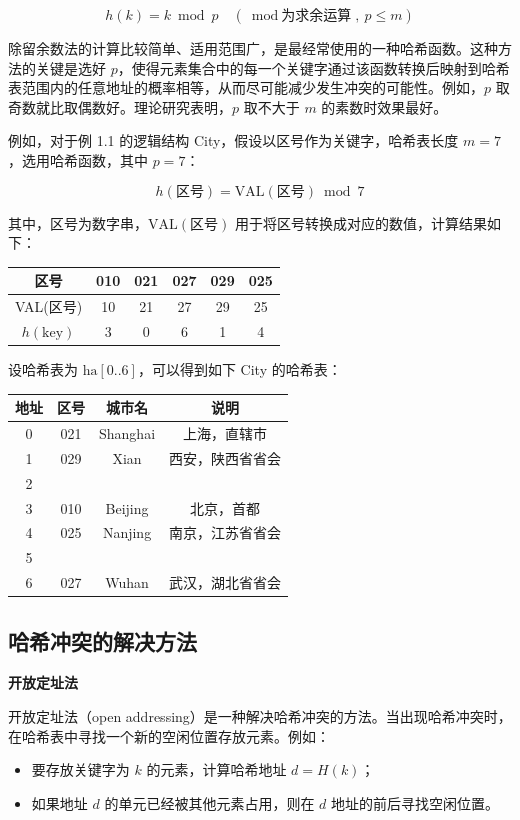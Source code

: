 \documentclass[lang=cn,newtx,10pt,scheme=chinese]{../elegantbook}
\begin{document}
\[
h(k) = k \bmod p \quad (\bmod \text{为求余运算},\ p \leq m)
\]

除留余数法的计算比较简单、适用范围广，是最经常使用的一种哈希函数。这种方法的关键是选好 $p$，使得元素集合中的每一个关键字通过该函数转换后映射到哈希表范围内的任意地址的概率相等，从而尽可能减少发生冲突的可能性。例如，$p$ 取奇数就比取偶数好。理论研究表明，$p$ 取不大于 $m$ 的素数时效果最好。

例如，对于例 1.1 的逻辑结构 City，假设以区号作为关键字，哈希表长度 $m=7$，选用哈希函数，其中 $p=7$：

\[
h(\text{区号}) = \text{VAL}(\text{区号}) \bmod 7
\]

其中，区号为数字串，$\text{VAL}(\text{区号})$ 用于将区号转换成对应的数值，计算结果如下：

\begin{center}
\begin{tabular}{|c|c|c|c|c|c|}
\hline
区号 & 010 & 021 & 027 & 029 & 025 \\
\hline
VAL(区号) & 10 & 21 & 27 & 29 & 25 \\
\hline
$h(\text{key})$ & 3 & 0 & 6 & 1 & 4 \\
\hline
\end{tabular}
\end{center}

设哈希表为 $\text{ha}[0..6]$，可以得到如下 City 的哈希表：

\begin{center}
\begin{tabular}{|c|c|c|c|}
\hline
地址 & 区号 & 城市名 & 说明 \\
\hline
0 & 021 & Shanghai & 上海，直辖市 \\
1 & 029 & Xian     & 西安，陕西省省会 \\
2 &      &          & \\
3 & 010 & Beijing  & 北京，首都 \\
4 & 025 & Nanjing  & 南京，江苏省省会 \\
5 &      &          & \\
6 & 027 & Wuhan    & 武汉，湖北省省会 \\
\hline
\end{tabular}
\end{center}

\subsection{哈希冲突的解决方法}
\textbf{开放定址法}

开放定址法（open addressing）是一种解决哈希冲突的方法。当出现哈希冲突时，在哈希表中寻找一个新的空闲位置存放元素。例如：
\begin{itemize}
  \item 要存放关键字为 $k$ 的元素，计算哈希地址 $d = H(k)$；
  \item 如果地址 $d$ 的单元已经被其他元素占用，则在 $d$ 地址的前后寻找空闲位置。
\end{itemize}
\end{document}
